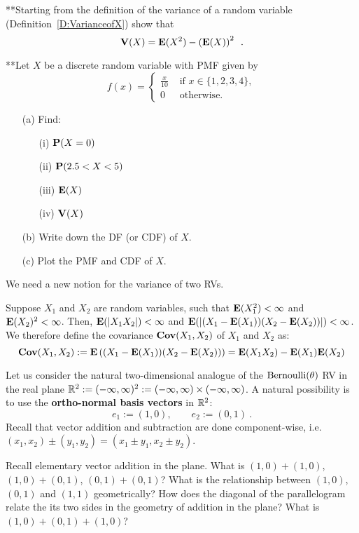\begin{ExerciseList}
\ee

\Exercise
{**}Starting from the definition of the variance of a random variable (Definition~\ref{D:VarianceofX}) show that
\[\mathbf{V}(X) = \mathbf{E}(X^2) - \left(\mathbf{E}(X)\right)^2 \enspace .\]

\Exercise
{**}Let $X$ be a discrete random variable with PMF given by
\[
f(x) = 
\begin{cases}
\frac{x}{10} & \text{ if } x \in \{1,2,3,4\} ,\\
0 & \text{ otherwise.}
\end{cases}
\]
\begin{itemize}
\item[(a)] Find:
\begin{itemize}
\item[(i)] $\mathbf{P}(X=0)$
\item[(ii)] $\mathbf{P}(2.5 < X < 5)$
\item[(iii)] $\mathbf{E}(X)$
\item[(iv)] $\mathbf{V}(X)$
\end{itemize}
\item[(b)] Write down the DF (or CDF) of $X$.
\item[(c)] Plot the PMF and CDF of $X$.
\end{itemize}

\Exercise


\end{ExerciseList}

\newpage

We need a new notion for the variance of two RVs.
\begin{definition}[Covariance]
Suppose $X_1$ and $X_2$ are random variables, such that $\mathbf{E}(X_1^2) < \infty$ and $\mathbf{E}(X_2)^2 < \infty$.  Then, $\mathbf{E}(|X_1 X_2|) < \infty$ and $\mathbf{E}(|(X_1-\mathbf{E}(X_1))(X_2-\mathbf{E}(X_2))|) < \infty$.  We therefore define the covariance $\mathbf{Cov}(X_1,X_2)$ of $X_1$ and $X_2$ as:
\[
\mathbf{Cov}(X_1,X_2) := \mathbf{E} \left((X_1-\mathbf{E}(X_1))(X_2-\mathbf{E}(X_2))\right) = \mathbf{E}(X_1 X_2) - \mathbf{E}(X_1) \mathbf{E}(X_2)
\]
\end{definition}

Let us consider the natural two-dimensional analogue of the $\mbox{{\rm Bernoulli}}(\theta)$ RV in the real plane $\mathbb{R}^2 := (-\infty,\infty)^2 := (-\infty,\infty) \times (-\infty,\infty)$.  A natural possibility is to use the {\bf ortho-normal basis vectors} in $\mathbb{R}^2$:
$$ \boxed{
e_1 := (1,0), \qquad e_2 := (0,1)
} \ .$$
Recall that vector addition and subtraction are done component-wise, i.e.~$(x_1,x_2) \pm (y_1,y_2) = (x_1\pm y_1,x_2 \pm y_2)$.

\begin{classwork}
Recall elementary vector addition in the plane.  What is $(1,0)+(1,0)$, $(1,0)+(0,1)$, $(0,1)+(0,1)$?  What is the relationship between $(1,0)$, $(0,1)$ and $(1,1)$ geometrically? How does the diagonal of the parallelogram relate the its two sides in the geometry of addition in the plane?  What is  $(1,0)+(0,1)+(1,0)$?
\end{classwork}

